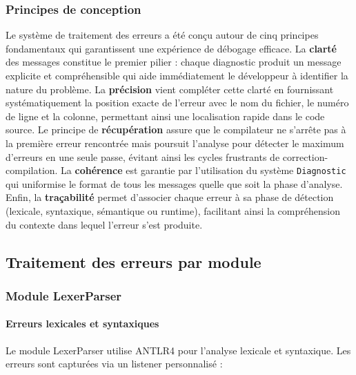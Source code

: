 \subsubsection{Principes de conception}

Le système de traitement des erreurs a été conçu autour de cinq principes fondamentaux qui garantissent une expérience de débogage efficace. La \textbf{clarté} des messages constitue le premier pilier : chaque diagnostic produit un message explicite et compréhensible qui aide immédiatement le développeur à identifier la nature du problème. La \textbf{précision} vient compléter cette clarté en fournissant systématiquement la position exacte de l'erreur avec le nom du fichier, le numéro de ligne et la colonne, permettant ainsi une localisation rapide dans le code source. Le principe de \textbf{récupération} assure que le compilateur ne s'arrête pas à la première erreur rencontrée mais poursuit l'analyse pour détecter le maximum d'erreurs en une seule passe, évitant ainsi les cycles frustrants de correction-compilation. La \textbf{cohérence} est garantie par l'utilisation du système \texttt{Diagnostic} qui uniformise le format de tous les messages quelle que soit la phase d'analyse. Enfin, la \textbf{traçabilité} permet d'associer chaque erreur à sa phase de détection (lexicale, syntaxique, sémantique ou runtime), facilitant ainsi la compréhension du contexte dans lequel l'erreur s'est produite.

\subsection{Traitement des erreurs par module}\label{subsec:traitement-des-erreurs-par-module}

\subsubsection{Module LexerParser}

\paragraph{Erreurs lexicales et syntaxiques}

Le module LexerParser utilise ANTLR4 pour l'analyse lexicale et syntaxique.
Les erreurs sont capturées via un listener personnalisé :

